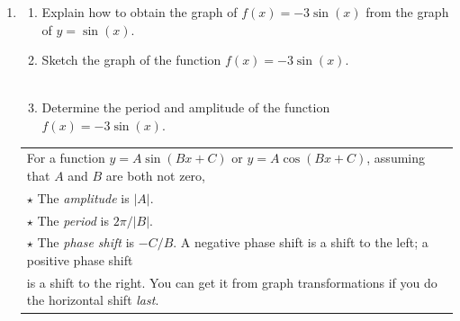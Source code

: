 \begin{enumerate}
\vspace{-.1in}
\item \begin{enumerate} \item Explain how to obtain the graph of $f(x)=-3\sin(x)$ from the graph of $y=\sin(x)$.\\[.5in]
\item Sketch the graph of the function $f(x)= -3\sin(x)$. \\
\\
\item Determine the period and amplitude of the function $f(x)= -3\sin(x)$. \\[1in]
\end{enumerate}



\hspace{-.3in} \begin{tabular}{| l | }
\hline 
For a function $y=A\sin(Bx+C)$ or $y=A \cos(Bx+C)$, assuming that $A$ and $B$ are both not zero, \\

$\star$ The \emph{amplitude} is $|A|$.\\
$\star$ The \emph{period} is $2\pi/|B|$.   \\
$\star$ The \emph{phase shift} is $-C/B$. A negative phase shift is a shift to the left; a positive phase shift\\ is a shift to the right. You can get it from graph transformations if you do the horizontal shift \emph{last}.%
\\ \hline
\end{tabular}


\end{enumerate}
